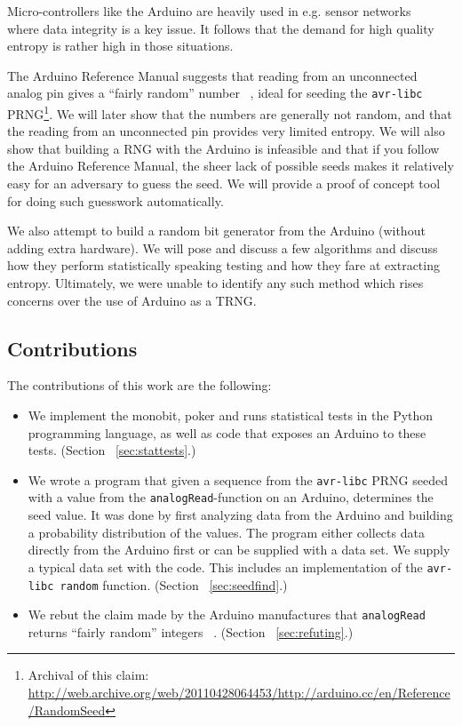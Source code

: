 \documentclass[a4paper]{article}           %
\begin{document}
Micro-controllers like the Arduino are heavily used in e.g. sensor networks ~\cite{tsense} where data integrity is a key issue. It follows that the demand for high quality entropy is rather high in those situations. 

The Arduino Reference Manual suggests that reading from an unconnected analog pin gives a ``fairly random'' number ~\cite{ardref}, ideal for seeding the \texttt{avr-libc} PRNG\footnote{Archival of this claim: \url{http://web.archive.org/web/20110428064453/http://arduino.cc/en/Reference/RandomSeed}}. We will later show that the numbers are generally not random, and that the reading from an unconnected pin provides very limited entropy. We will also show that building a RNG with the Arduino is infeasible and that if you follow the Arduino Reference Manual, the sheer lack of possible seeds makes it relatively easy for an adversary to guess the seed. We will provide a proof of concept tool for doing such guesswork automatically. 

We also attempt to build a random bit generator from the Arduino (without adding extra hardware). We will pose and discuss a few algorithms and discuss how they perform statistically speaking testing and how they fare at extracting entropy. Ultimately, we were unable to identify any such method which rises concerns over the use of Arduino as a TRNG. 

\subsection{Contributions}

The contributions of this work are the following:

\begin{itemize}
\item We implement the monobit, poker and runs statistical tests in the Python programming language, as well as code that exposes an Arduino to these tests. (Section ~\ref{sec:stattests}.)
\item We wrote a program that given a sequence from the \texttt{avr-libc} PRNG seeded with a value from the \texttt{analogRead}-function on an Arduino, determines the seed value. It was done by first analyzing data from the Arduino and building a probability distribution of the values. The program either collects data directly from the Arduino first or can be supplied with a data set. We supply a typical data set with the code. This includes an implementation of the \texttt{avr-libc random} function. (Section ~\ref{sec:seedfind}.)
\item We rebut the claim made by the Arduino manufactures that \texttt{analogRead} returns ``fairly random'' integers ~\cite{ardref}. (Section ~\ref{sec:refuting}.)

\end{itemize}
\end{document}
